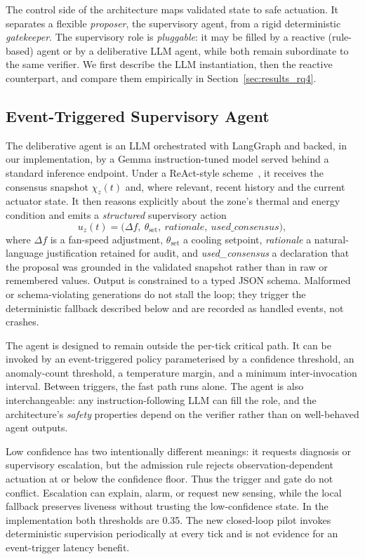 \documentclass[smartcities,article,submit,moreauthors]{Definitions/mdpi}
\begin{document}
The control side of the architecture maps validated state to safe
actuation. It separates a flexible \emph{proposer}, the supervisory
agent, from a rigid deterministic \emph{gatekeeper}. The supervisory role
is \emph{pluggable}: it may be filled by a reactive (rule-based) agent or
by a deliberative LLM agent, while both remain subordinate to the same
verifier. We first describe the LLM instantiation, then the reactive
counterpart, and compare them empirically in Section~\ref{sec:results_rq4}.

\subsection{Event-Triggered Supervisory Agent}
\label{sec:planner}

The deliberative agent is an LLM orchestrated with LangGraph and backed,
in our implementation, by a Gemma instruction-tuned model served behind a
standard inference endpoint. Under a ReAct-style
scheme~\cite{yao2023react}, it receives the consensus snapshot
$\chi_z(t)$ and, where relevant, recent history and the current actuator
state. It then reasons explicitly about the zone's thermal and energy
condition and emits a \emph{structured} supervisory action
\begin{equation}
u_z(t)=\bigl(\Delta f,\ \theta_{\mathrm{set}},\
\textit{rationale},\ \textit{used\_consensus}\bigr),
\label{eq:action}
\end{equation}
where $\Delta f$ is a fan-speed adjustment, $\theta_{\mathrm{set}}$ a
cooling setpoint, \textit{rationale} a natural-language justification
retained for audit, and \textit{used\_consensus} a declaration that the
proposal was grounded in the validated snapshot rather than in raw or
remembered values. Output is constrained to a typed JSON schema.
Malformed or schema-violating generations do not stall the loop; they
trigger the deterministic fallback described below and are recorded as
handled events, not crashes.

The agent is designed to remain outside the per-tick critical path. It can be
invoked by an event-triggered policy parameterised by a confidence
threshold, an anomaly-count threshold, a temperature margin, and a
minimum inter-invocation interval. Between triggers, the fast path runs
alone. The agent is also interchangeable: any instruction-following LLM
can fill the role, and the architecture's \emph{safety} properties
depend on the verifier rather than on well-behaved agent outputs.

Low confidence has two intentionally different meanings: it requests
diagnosis or supervisory escalation, but the admission rule rejects
observation-dependent actuation at or below the confidence floor. Thus the
trigger and gate do not conflict. Escalation can explain, alarm, or request new
sensing, while the local fallback preserves liveness without trusting the
low-confidence state. In the implementation both thresholds are 0.35. The new
closed-loop pilot invokes deterministic supervision periodically at every tick
and is not evidence for an event-trigger latency benefit.
\end{document}
